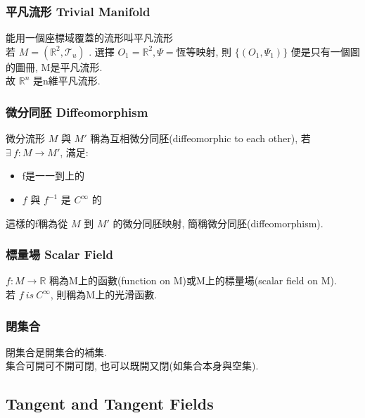 \documentclass{article}
\begin{document}
\begin{CJK}{UTF8}{bsmi}
\subsubsection{平凡流形 Trivial Manifold}
能用一個座標域覆蓋的流形叫平凡流形
\\若 $M=(\mathbb{R}^2,\mathscr{T}_u)$ . 選擇 $O_1=\mathbb{R}^2,\Psi=$恆等映射, 則 $\{(O_1,\Psi_1)\}$ 便是只有一個圖的圖冊, M是平凡流形.
\\ 故 $\mathbb{R}^n$ 是n維平凡流形.
\subsubsection{微分同胚 Diffeomorphism}
微分流形 $M$ 與 $M'$ 稱為互相微分同胚(diffeomorphic to each other), 若 $\exists \ f: M \rightarrow M'$, 滿足:
\begin{itemize}
  \item f是一一到上的
  \item $f$ 與 $f^{-1}$ 是 $C^{\infty}$ 的
\end{itemize}
這樣的f稱為從 $M$ 到 $M'$ 的微分同胚映射, 簡稱微分同胚(diffeomorphism).
\subsubsection{標量場 Scalar Field}
$f:M \rightarrow \mathbb{R}$ 稱為M上的函數(function on M)或M上的標量場(scalar field on M).
\\ 若 $f \ is \ C^{\infty} $, 則稱為M上的光滑函數.
\subsubsection{閉集合}
閉集合是開集合的補集.
\\ 集合可開可不開可閉, 也可以既開又閉(如集合本身與空集).
\subsection{Tangent and Tangent Fields}

\end{CJK}
\end{document}
